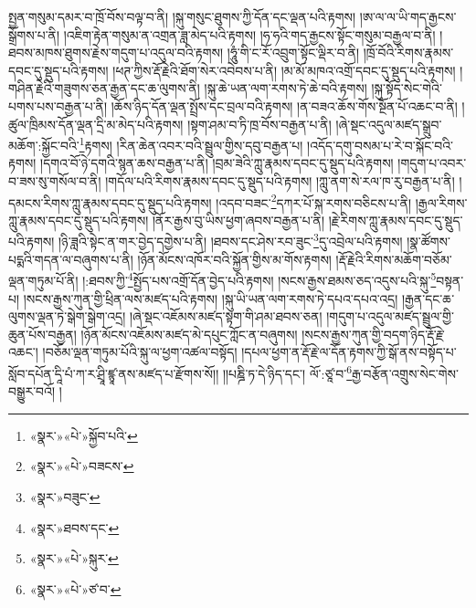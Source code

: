 སྤྱན་གསུམ་དམར་བ་ཁྲོ་བོས་བལྟ་བ་ནི། །སྐུ་གསུང་ཐུགས་ཀྱི་དོན་དང་ལྡན་པའི་རྟགས། །ཨ་ལ་ལ་ཡི་གད་རྒྱངས་སྒྲོགས་པ་ནི། །འཇིག་རྟེན་གསུམ་ན་འགྲན་ཟླ་མེད་པའི་རྟགས། །ཧ་ཧའི་གད་རྒྱངས་སྟོང་གསུམ་བརྒྱལ་བ་ནི། །ཐབས་མཁས་ཐུགས་རྗེས་གདུག་པ་འདུལ་བའི་རྟགས། །ཧཱུཾ་གི་ང་རོ་འབྲུག་སྟོང་ལྡིར་བ་ནི། །ཁྲོ་བོའི་རིགས་རྣམས་དབང་དུ་སྡུད་པའི་རྟགས། །ཕཊ་ཀྱིས་རྡོ་རྗེའི་ཐོག་སེར་འབེབས་པ་ནི། །མ་མོ་མཁའ་འགྲོ་དབང་དུ་སྡུད་པའི་རྟགས། །གཤིན་རྗེའི་གཟུགས་ཅན་རྒྱན་དང་ཆ་ལུགས་ནི། །སྐུ་ཆེ་ཡན་ལག་རགས་ཏེ་ཆེ་བའི་རྟགས། །སྐུ་སྟོད་སེང་གེའི་པགས་པས་བརྒྱན་པ་ནི། །ཆོས་ཉིད་དོན་ལྡན་སྤྲོས་དང་བྲལ་བའི་རྟགས། །ན་བཟའ་ཆོས་གོས་སྔོན་པོ་འཆང་བ་ནི། །ཚུལ་ཁྲིམས་དོན་ལྡན་དྲི་མ་མེད་པའི་རྟགས། །སྟག་ཤམ་བ་ཏི་ཁྲ་བོས་བརྒྱན་པ་ནི། །ཞེ་སྡང་འདུལ་མཛད་སྒྲུབ་མཆོག་:སྐྱོང་བའི་\footnote{«སྣར་»«པེ་»སྐྱོབ་པའི་}རྟགས། །རིན་ཆེན་འབར་བའི་སྦྲུལ་གྱིས་དབུ་བརྒྱན་པ། །འདོད་དགུ་བསམ་པ་རེ་བ་སྐོང་བའི་རྟགས། །དགའ་བོ་ཉེ་དགའི་སྙན་ཆས་བརྒྱན་པ་ནི། །བྲམ་ཟེའི་ཀླུ་རྣམས་དབང་དུ་སྡུད་པའི་རྟགས། །གདུག་པ་འབར་བ་ཟས་སུ་གསོལ་བ་ནི། །གདོལ་པའི་རིགས་རྣམས་དབང་དུ་སྡུད་པའི་རྟགས། །ཀླུ་ནག་སེ་རལ་ཁ་རུ་བརྒྱན་པ་ནི། །དམངས་རིགས་ཀླུ་རྣམས་དབང་དུ་སྡུད་པའི་རྟགས། །འདབ་བཟང་\footnote{«སྣར་»«པེ་»བཟངས་}དཀར་པོ་སྐ་རགས་བཅིངས་པ་ནི། །རྒྱལ་རིགས་ཀླུ་རྣམས་དབང་དུ་སྡུད་པའི་རྟགས། །ནོར་རྒྱས་བུ་ཡིས་ཕྱག་ཞབས་བརྒྱན་པ་ནི། །རྗེ་རིགས་ཀླུ་རྣམས་དབང་དུ་སྡུད་པའི་རྟགས། །ཉི་ཟླའི་སྟེང་ན་གར་བྱེད་དགྱེས་པ་ནི། །ཐབས་དང་ཤེས་རབ་ཟུང་\footnote{«སྣར་»བཟུང་}དུ་འབྲེལ་པའི་རྟགས། །སྣ་ཚོགས་པདྨའི་གདན་ལ་བཞུགས་པ་ནི། །ཉོན་མོངས་འཁོར་བའི་སྐྱོན་གྱིས་མ་གོས་རྟགས། །རྡོ་རྗེའི་རིགས་མཆོག་བཅོམ་ལྡན་གཏུམ་པོ་ནི། །:ཐབས་ཀྱི་\footnote{«སྣར་»ཐབས་དང་}སྤྱོད་པས་འགྲོ་དོན་བྱེད་པའི་རྟགས། །སངས་རྒྱས་ཐམས་ཅད་འདུས་པའི་སྐུ་\footnote{«སྣར་»«པེ་»སྐུར་}བསྟན་པ། །སངས་རྒྱས་ཀུན་གྱི་ཕྲིན་ལས་མཛད་པའི་རྟགས། །སྐུ་ཡི་ཡན་ལག་རགས་ཏེ་དཔའ་དཔའ་འདྲ། །རྒྱན་དང་ཆ་ལུགས་ལྡན་ཏེ་སྒེག་སྒེག་འདྲ། །ཞེ་སྡང་འཇོམས་མཛད་སྟག་གི་ཤམ་ཐབས་ཅན། །གདུག་པ་འདུལ་མཛད་སྦྲུལ་གྱི་ཆུན་པོས་བརྒྱན། །ཉོན་མོངས་འཇོམས་མཛད་མེ་དཔུང་ཀློང་ན་བཞུགས། །སངས་རྒྱས་ཀུན་གྱི་བདག་ཉིད་རྡོ་རྗེ་འཆང་། །བཅོམ་ལྡན་གཏུམ་པོའི་སྐུ་ལ་ཕྱག་འཚལ་བསྟོད། །དཔལ་ཕྱག་ན་རྡོ་རྗེ་ལ་དོན་རྟགས་ཀྱི་སྒོ་ནས་བསྟོད་པ་སློབ་དཔོན་དཱི་པཾ་ཀ་ར་ཤྲཱི་ཛྙཱ་ནས་མཛད་པ་རྫོགས་སོ།། །།པཎྜི་ཏ་དེ་ཉིད་དང་། ལོ་:ཙཱ་བ་\footnote{«སྣར་»«པེ་»ཙ་བ་}རྒྱ་བརྩོན་འགྲུས་སེང་གེས་བསྒྱུར་བའོ། ། 